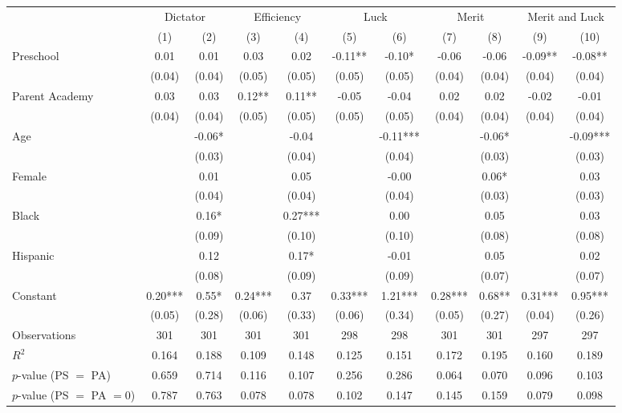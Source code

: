\begin{tabular}{lcccccccccc}
\toprule
 & \multicolumn{2}{c}{Dictator} & \multicolumn{2}{c}{Efficiency} & \multicolumn{2}{c}{Luck} & \multicolumn{2}{c}{Merit} & \multicolumn{2}{c}{Merit and Luck} \\
 & (1) & (2) & (3) & (4) & (5) & (6) & (7) & (8) & (9) & (10) \\
\midrule
Preschool & 0.01 & 0.01 & 0.03 & 0.02 & -0.11** & -0.10* & -0.06 & -0.06 & -0.09** & -0.08** \\
 & (0.04) & (0.04) & (0.05) & (0.05) & (0.05) & (0.05) & (0.04) & (0.04) & (0.04) & (0.04) \\
Parent Academy & 0.03 & 0.03 & 0.12** & 0.11** & -0.05 & -0.04 & 0.02 & 0.02 & -0.02 & -0.01 \\
 & (0.04) & (0.04) & (0.05) & (0.05) & (0.05) & (0.05) & (0.04) & (0.04) & (0.04) & (0.04) \\
Age &  & -0.06* &  & -0.04 &  & -0.11*** &  & -0.06* &  & -0.09*** \\
 &  & (0.03) &  & (0.04) &  & (0.04) &  & (0.03) &  & (0.03) \\
Female &  & 0.01 &  & 0.05 &  & -0.00 &  & 0.06* &  & 0.03 \\
 &  & (0.04) &  & (0.04) &  & (0.04) &  & (0.03) &  & (0.03) \\
Black &  & 0.16* &  & 0.27*** &  & 0.00 &  & 0.05 &  & 0.03 \\
 &  & (0.09) &  & (0.10) &  & (0.10) &  & (0.08) &  & (0.08) \\
Hispanic &  & 0.12 &  & 0.17* &  & -0.01 &  & 0.05 &  & 0.02 \\
 &  & (0.08) &  & (0.09) &  & (0.09) &  & (0.07) &  & (0.07) \\
Constant & 0.20*** & 0.55* & 0.24*** & 0.37 & 0.33*** & 1.21*** & 0.28*** & 0.68** & 0.31*** & 0.95*** \\
 & (0.05) & (0.28) & (0.06) & (0.33) & (0.06) & (0.34) & (0.05) & (0.27) & (0.04) & (0.26) \\
\midrule
Observations & 301 & 301 & 301 & 301 & 298 & 298 & 301 & 301 & 297 & 297 \\
$R^2$ & 0.164 & 0.188 & 0.109 & 0.148 & 0.125 & 0.151 & 0.172 & 0.195 & 0.160 & 0.189 \\
$p$-value (PS $=$ PA) & 0.659 & 0.714 & 0.116 & 0.107 & 0.256 & 0.286 & 0.064 & 0.070 & 0.096 & 0.103 \\
$p$-value (PS $=$ PA $= 0$) & 0.787 & 0.763 & 0.078 & 0.078 & 0.102 & 0.147 & 0.145 & 0.159 & 0.079 & 0.098 \\
\bottomrule
\end{tabular}

